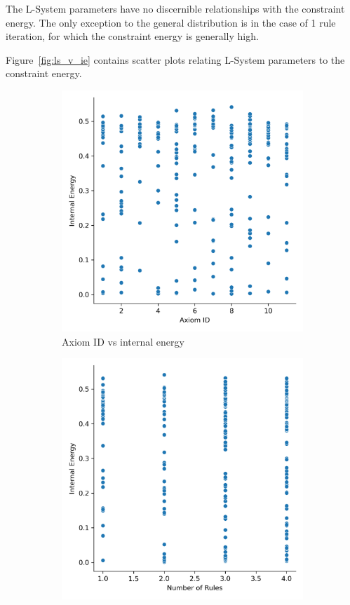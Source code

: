 The L-System parameters have no discernible relationships with the constraint energy. The only exception to the general distribution is in the case of 1 rule iteration, for which the constraint energy is generally high.

Figure~\ref{fig:ls_v_ie} contains scatter plots relating L-System parameters to the constraint energy.

\begin{figure}[H]
	\centering
	\begin{subfigure}[c]{0.45\textwidth}
		\centering
		\includegraphics[width=\textwidth]{aid_vs_ie.png}
		\caption{Axiom ID vs internal energy}
	\end{subfigure}
	\hfill
	\begin{subfigure}[c]{0.45\textwidth}
		\centering
		\includegraphics[width=\textwidth]{nor_vs_ie.png}

\end{subfigure}
\end{figure}
